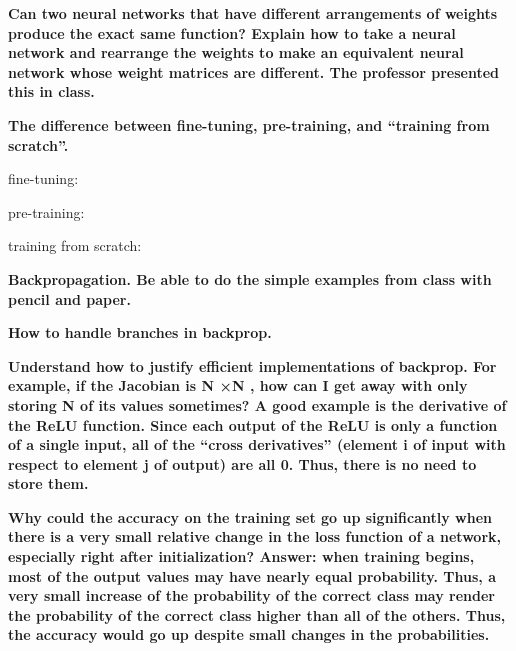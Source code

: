 \documentclass[10pt,letterpaper]{article}
\begin{document}
\subitem \textbf{ Can two neural networks that have different arrangements of weights produce the exact same function? Explain how to take a neural network and rearrange the weights to make an equivalent neural network whose weight matrices are different. The professor presented this in class.}
\begin{solution}
\end{solution}


\subitem \textbf{ The difference between fine-tuning, pre-training, and “training from scratch”.}
\begin{solution}
fine-tuning:

\par
pre-training:

\par
training from scratch:
\end{solution}


\subitem \textbf{ Backpropagation. Be able to do the simple examples from class with pencil and paper.}
\begin{solution}
\end{solution}

\subitem \textbf{ How to handle branches in backprop.}
\begin{solution}
\end{solution}

\subitem \textbf{ Understand how to justify efficient implementations of backprop. For example, if the Jacobian is N ×N , how can I get away with only storing N of its values sometimes? A good example is the derivative of the ReLU function. Since each output of the ReLU is only a function of a single input, all of the “cross derivatives” (element i of input with respect to element j of output) are all 0. Thus, there is no need to store them.}
\begin{solution}
\end{solution}

\subitem \textbf{ Why could the accuracy on the training set go up significantly when there is a very small relative change in the loss function of a network, especially right after initialization? 
\subsubitem Answer: when training begins, most of the output values may have nearly equal probability. Thus, a very small increase of the probability of the correct class may render the probability of the correct class higher than all of the others. Thus, the accuracy would go up despite small changes in the probabilities.}
\begin{solution}
\end{solution}
\end{document}
